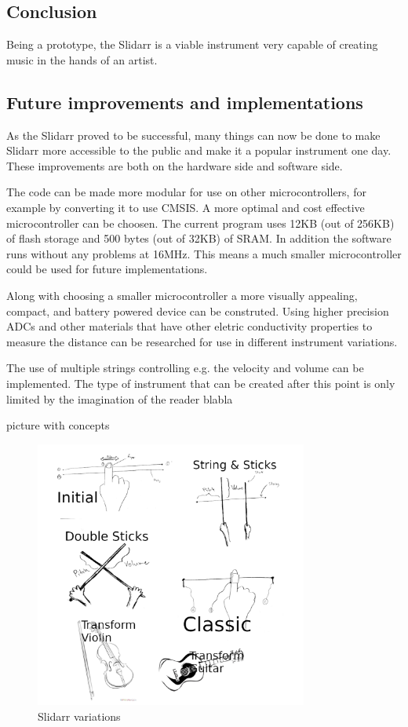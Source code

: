 \documentclass{article}
\begin{document}
\subsection{Conclusion}
Being a prototype, the Slidarr is a viable instrument very capable of creating music in the hands of an artist.

\subsection{Future improvements and implementations}
As the Slidarr proved to be successful, many things can now be done to make Slidarr more accessible to the public and make it a popular instrument one day. These improvements are both on the hardware side and software side.

The code can be made more modular for use on other microcontrollers, for example by converting it to use CMSIS. A more optimal and cost effective microcontroller can be choosen. The current program uses 12KB (out of 256KB) of flash storage and 500 bytes (out of 32KB) of SRAM. In addition the software runs without any problems at 16MHz. This means a much smaller microcontroller could be used for future implementations.

Along with choosing a smaller microcontroller a more visually appealing, compact, and battery powered device can be construted. Using higher precision ADCs and other materials that have other eletric conductivity properties to measure the distance can be researched for use in different instrument variations.

The use of multiple strings controlling e.g. the velocity and volume can be implemented. The type of instrument that can be created after this point is only limited by the imagination of the reader blabla

picture with concepts

\begin{figure}[ht]
  \centering
  \includegraphics[width=0.8\textwidth]{slidarrversions.png}
  \caption{Slidarr variations}
  \label{fig:slidarr variations}
\end{figure}
\end{document}
